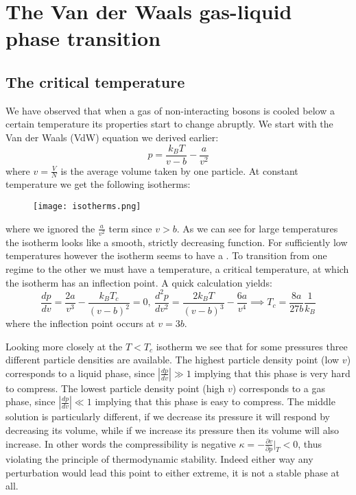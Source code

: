 \documentclass[a4paper,11pt,oneside]{book}
\begin{document}
\section{The Van der Waals gas-liquid phase transition}
\subsection*{The critical temperature}
We have observed that when a gas of non-interacting bosons is cooled below a certain temperature its properties start to change abruptly. We start with the Van der Waals (VdW) equation we derived earlier:
\begin{equation}
    p = \frac{k_B T}{v-b} - \frac{a}{v^2}
\end{equation}
where $v=\frac{V}{N}$ is the average volume taken by one particle. At constant temperature we get the following isotherms:
\begin{figure}[h!]
    \centering
    \texttt{[image: isotherms.png]}
    \label{fig:my_label}
\end{figure}
where we ignored the $\frac{a}{v^2}$ term since $v>b$. As we can see for large temperatures the isotherm looks like a smooth, strictly decreasing function. For sufficiently low temperatures however the isotherm seems to have a . To transition from one regime to the other we must have a temperature, a critical temperature, at which the isotherm has an inflection point. A quick calculation yields:
\begin{equation}
    \frac{dp}{dv} = \frac{2a}{v^3}-\frac{k_BT_c}{(v-b)^2}=0, \ \frac{d^2p}{dv^2} =\frac{2k_BT}{(v-b)^3} -\frac{6a}{v^4} \implies T_c = \frac{8a}{27b}\frac{1}{k_B}
\end{equation}
where the inflection point occurs at $v=3b$.

Looking more closely at the $T<T_c$ isotherm we see that for some pressures three different particle densities are available. The highest particle density point (low $v$) corresponds to a liquid phase, since $|\frac{dp}{dv}|\gg1$ implying that this phase is very hard to compress. The lowest particle density point (high $v$) corresponds to a gas phase, since $|\frac{dp}{dv}|\ll 1$ implying that this phase is easy to compress. The middle solution is particularly different, if we decrease its pressure it will respond by decreasing its volume, while if we increase its pressure then its volume will also increase. In other words the compressibility is negative $\kappa = -\frac{\partial v}{\partial p}\bigg|_T<0$, thus violating the principle of thermodynamic stability. Indeed either way any perturbation would lead this point to either extreme, it is not a stable phase at all.
\end{document}
